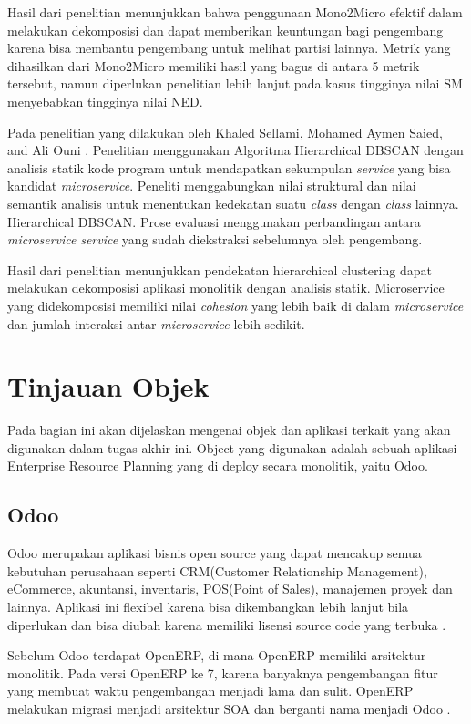Hasil dari penelitian menunjukkan bahwa penggunaan Mono2Micro efektif dalam melakukan dekomposisi dan dapat memberikan keuntungan bagi pengembang karena bisa membantu pengembang untuk melihat partisi lainnya. Metrik yang dihasilkan dari Mono2Micro memiliki hasil yang bagus di antara 5 metrik tersebut, namun diperlukan penelitian lebih lanjut pada kasus tingginya nilai SM menyebabkan tingginya nilai NED.

Pada penelitian yang dilakukan oleh Khaled Sellami, Mohamed Aymen Saied, and Ali Ouni \cite{ECD}. Penelitian menggunakan Algoritma Hierarchical DBSCAN dengan analisis statik kode program untuk mendapatkan sekumpulan \textit{service} yang bisa kandidat \textit{microservice}.  Peneliti menggabungkan nilai struktural dan nilai semantik analisis untuk menentukan kedekatan suatu \textit{class} dengan \textit{class} lainnya.
Hierarchical DBSCAN. Prose evaluasi menggunakan perbandingan antara \textit{microservice} \textit{service} yang sudah diekstraksi sebelumnya oleh pengembang. 

Hasil dari penelitian menunjukkan pendekatan hierarchical clustering dapat melakukan dekomposisi aplikasi monolitik dengan analisis statik. Microservice yang didekomposisi memiliki nilai \textit{cohesion} yang lebih baik di dalam \textit{microservice} dan  jumlah interaksi antar \textit{microservice} lebih sedikit.
\\

\section{Tinjauan Objek}
Pada bagian ini akan dijelaskan mengenai objek dan aplikasi terkait yang akan digunakan dalam tugas akhir ini. Object yang digunakan adalah sebuah aplikasi Enterprise Resource Planning yang di deploy secara monolitik, yaitu Odoo.

\subsection{Odoo}
Odoo merupakan aplikasi bisnis open source yang dapat mencakup semua kebutuhan perusahaan seperti CRM(Customer Relationship Management), eCommerce, akuntansi, inventaris, POS(Point of Sales), manajemen proyek dan lainnya. Aplikasi ini flexibel karena bisa dikembangkan lebih lanjut bila diperlukan dan bisa diubah karena memiliki lisensi source code yang terbuka \cite{odoo}. 

Sebelum Odoo terdapat OpenERP, di mana OpenERP memiliki arsitektur monolitik. Pada versi OpenERP ke 7, karena banyaknya pengembangan fitur yang membuat waktu pengembangan menjadi lama dan sulit. OpenERP melakukan migrasi menjadi arsitektur SOA dan berganti nama menjadi Odoo \cite{5FA}.

